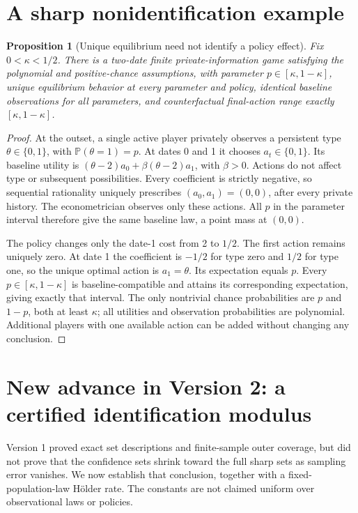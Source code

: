 \documentclass[11pt]{article}
\newtheorem{proposition}[theorem]{Proposition}
\theoremstyle{remark}\newtheorem{remark}[theorem]{Remark}
\newcommand{\Prb}{\mathbb P}
\begin{document}
\section*{A sharp nonidentification example}
\begin{proposition}[Unique equilibrium need not identify a policy effect]\label{prop:example}
Fix $0<\kappa<1/2$. There is a two-date finite private-information game satisfying the polynomial and positive-chance assumptions, with parameter $p\in[\kappa,1-\kappa]$, unique equilibrium behavior at every parameter and policy, identical baseline observations for all parameters, and counterfactual final-action range exactly $[\kappa,1-\kappa]$.
\end{proposition}
\begin{proof}
At the outset, a single active player privately observes a persistent type $\theta\in\{0,1\}$, with $\Prb(\theta=1)=p$. At dates 0 and 1 it chooses $a_t\in\{0,1\}$. Its baseline utility is
$(\theta-2)a_0+\beta(\theta-2)a_1$, with $\beta>0$. Actions do not affect type or subsequent possibilities. Every coefficient is strictly negative, so sequential rationality uniquely prescribes $(a_0,a_1)=(0,0)$, after every private history. The econometrician observes only these actions. All $p$ in the parameter interval therefore give the same baseline law, a point mass at $(0,0)$.

The policy changes only the date-1 cost from 2 to $1/2$. The first action remains uniquely zero. At date 1 the coefficient is $-1/2$ for type zero and $1/2$ for type one, so the unique optimal action is $a_1=\theta$. Its expectation equals $p$. Every $p\in[\kappa,1-\kappa]$ is baseline-compatible and attains its corresponding expectation, giving exactly that interval. The only nontrivial chance probabilities are $p$ and $1-p$, both at least $\kappa$; all utilities and observation probabilities are polynomial. Additional players with one available action can be added without changing any conclusion.
\end{proof}

\section*{New advance in Version 2: a certified identification modulus}
Version 1 proved exact set descriptions and finite-sample outer coverage,
but did not prove that the confidence sets shrink toward the full sharp
sets as sampling error vanishes. We now establish that conclusion, together
with a fixed-population-law H\"older rate. The constants are not claimed
uniform over observational laws or policies.
\end{document}
